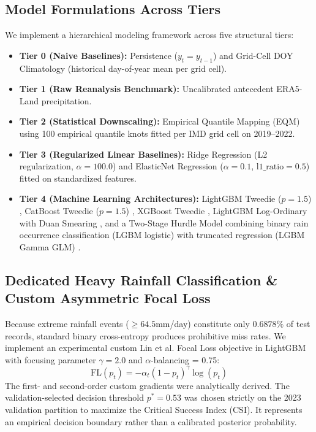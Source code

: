 \documentclass[pdflatex,sn-mathphys,Numbered]{sn-jnl}
\begin{document}
\subsection{Model Formulations Across Tiers}
We implement a hierarchical modeling framework across five structural tiers:
\begin{itemize}
    \item \textbf{Tier 0 (Naive Baselines):} Persistence ($y_t = y_{t-1}$) and Grid-Cell DOY Climatology (historical day-of-year mean per grid cell).
    \item \textbf{Tier 1 (Raw Reanalysis Benchmark):} Uncalibrated antecedent ERA5-Land precipitation.
    \item \textbf{Tier 2 (Statistical Downscaling):} Empirical Quantile Mapping (EQM) \cite{piani2011} using 100 empirical quantile knots fitted per IMD grid cell on 2019--2022.
    \item \textbf{Tier 3 (Regularized Linear Baselines):} Ridge Regression (L2 regularization, $\alpha = 100.0$) and ElasticNet Regression ($\alpha = 0.1$, $\text{l1\_ratio} = 0.5$) fitted on standardized features.
    \item \textbf{Tier 4 (Machine Learning Architectures):} LightGBM Tweedie ($p=1.5$) \cite{ke2017, tweedie1984, dunn2005}, CatBoost Tweedie ($p=1.5$) \cite{prokhorenkova2018}, XGBoost Tweedie \cite{chen2016}, LightGBM Log-Ordinary with Duan Smearing \cite{duan1983}, and a Two-Stage Hurdle Model combining binary rain occurrence classification (LGBM logistic) with truncated regression (LGBM Gamma GLM) \cite{cragg1971}.
\end{itemize}

\subsection{Dedicated Heavy Rainfall Classification \& Custom Asymmetric Focal Loss}
Because extreme rainfall events ($\ge 64.5$\;mm/day) constitute only $0.6878\%$ of test records, standard binary cross-entropy produces prohibitive miss rates. We implement an experimental custom Lin et al. \cite{lin2017} Focal Loss objective in LightGBM with focusing parameter $\gamma = 2.0$ and $\alpha$-balancing = 0.75:
\begin{equation}
\text{FL}(p_t) = -\alpha_t (1 - p_t)^\gamma \log(p_t)
\end{equation}
The first- and second-order custom gradients were analytically derived. The validation-selected decision threshold $p^* = 0.53$ was chosen strictly on the 2023 validation partition to maximize the Critical Success Index (CSI). It represents an empirical decision boundary rather than a calibrated posterior probability.
\end{document}
